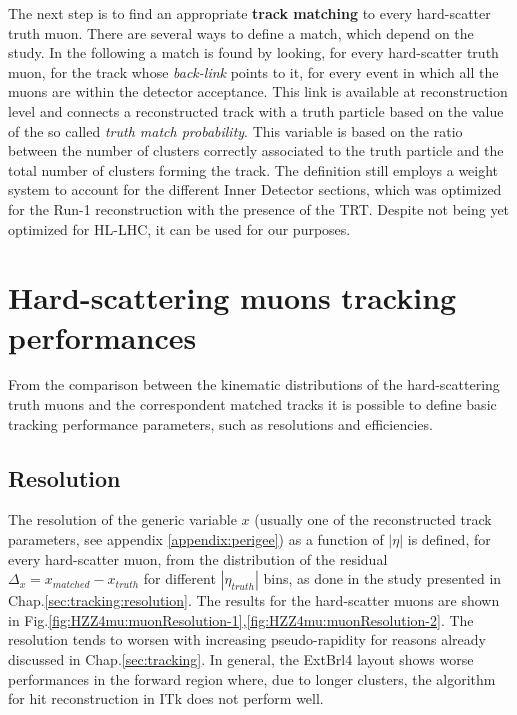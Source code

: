 \documentclass[a4paper,twoside,12pt]{book}
\begin{document}
The next step is to find an appropriate \textbf{track matching} to every hard-scatter truth muon. There
are several ways to define a match, which depend on the study. In the following a match is found by looking,
for every hard-scatter truth muon, for the track whose \textit{back-link} points to it, for every event in which all the muons are within
the detector acceptance. This link is available at reconstruction
level and connects a reconstructed track with a truth particle based on the value of the so called \textit{truth match probability}.
This variable is based on the ratio between the number of clusters correctly associated to the truth particle and the total number
of clusters forming the track. The definition still employs a weight system to account for the different Inner Detector sections,
which was optimized for the Run-1 reconstruction with the presence of the TRT. Despite not being yet optimized for HL-LHC, it
can be used for our purposes.

\section{Hard-scattering muons tracking performances}
From the comparison between the kinematic distributions of the hard-scattering truth muons and the correspondent matched 
tracks it is possible to define basic tracking performance parameters, such as resolutions and efficiencies. \\

\subsection*{Resolution}
The resolution of the generic variable $x$ (usually one of the reconstructed track parameters, see appendix \ref{appendix:perigee}) as a function of $|\eta|$ is defined, for every hard-scatter muon, from the distribution of the residual 
$\Delta_x = x_{matched} - x_{truth}$ for different $|\eta_{truth}|$ bins, as done in the study presented in Chap.\ref{sec:tracking:resolution}. 
The results for the hard-scatter muons are shown in Fig.\ref{fig:HZZ4mu:muonResolution-1},\ref{fig:HZZ4mu:muonResolution-2}.
The resolution tends to worsen 
with increasing pseudo-rapidity for reasons already discussed in Chap.\ref{sec:tracking}. In general, the ExtBrl4 layout shows worse performances in the forward region where, due to longer clusters, the algorithm for hit reconstruction in ITk
does not perform well.\\
\end{document}
